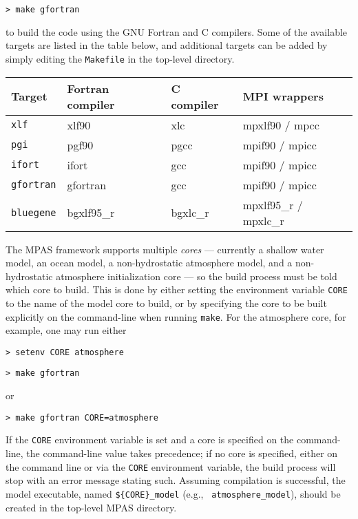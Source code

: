 \vspace{12pt}
{\tt > make gfortran}
\vspace{12pt}

\noindent to build the code using the GNU Fortran and C compilers. Some of the
available targets are listed in the table below, and additional targets can be
added by simply editing the {\tt Makefile} in the top-level directory.

\vspace{12pt}
\begin{longtable}{| l | l | l | l |}
\hline
Target & Fortran compiler & C compiler & MPI wrappers \\ \hline \hline
{\tt xlf} & xlf90 & xlc & mpxlf90 / mpcc \\ \hline
{\tt pgi} & pgf90 & pgcc & mpif90 / mpicc \\ \hline
{\tt ifort} & ifort & gcc & mpif90 / mpicc \\ \hline
{\tt gfortran} & gfortran & gcc & mpif90 / mpicc \\ \hline
{\tt bluegene} & bgxlf95\_r & bgxlc\_r & mpxlf95\_r / mpxlc\_r \\ \hline
\end{longtable}
\vspace{12pt}

The MPAS framework supports multiple {\em cores} --- currently a shallow water
model, an ocean model, a non-hydrostatic atmosphere model, and a non-hydrostatic
atmosphere initialization core --- so the build process must be told which core
to build. This is done by either setting the environment variable {\tt CORE} to
the name of the model core to build, or by specifying the core to be built
explicitly on the command-line when running {\tt make}. For the atmosphere
core, for example, one may run either

\vspace{12pt}
{\tt > setenv CORE atmosphere}

{\tt > make gfortran}
\vspace{12pt}

\noindent or

\vspace{12pt}
{\tt > make gfortran CORE=atmosphere}
\vspace{12pt}

If the {\tt CORE} environment variable is set and a core is specified on the
command-line, the command-line value takes precedence; if no core is specified,
either on the command line or via the {\tt CORE} environment variable, the build
process will stop with an error message stating such.  Assuming compilation is
successful, the model executable, named {\tt \$\{CORE\}\_model} (e.g., {\tt
atmosphere\_model}), should be created in the top-level MPAS directory.

